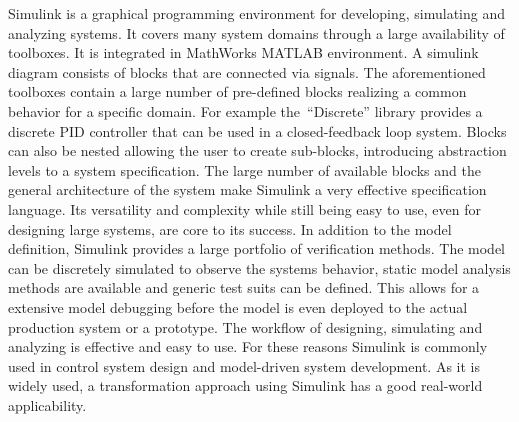 Simulink is a graphical programming environment for developing, simulating and analyzing systems.
It covers many system domains through a large availability of toolboxes.
It is integrated in MathWorks MATLAB environment.
A simulink diagram consists of blocks that are connected via signals.
The aforementioned toolboxes contain a large number of pre-defined blocks realizing a common behavior for a specific domain.
For example the~\enquote{Discrete} library provides a discrete PID controller that can be used in a closed-feedback loop system.
Blocks can also be nested allowing the user to create sub-blocks, introducing abstraction levels to a system specification.
The large number of available blocks and the general architecture of the system make Simulink a very effective specification language.
Its versatility and complexity while still being easy to use, even for designing large systems, are core to its success.
In addition to the model definition, Simulink provides a large portfolio of verification methods.
The model can be discretely simulated to observe the systems behavior, static model analysis methods are available and generic test suits can be defined.
This allows for a extensive model debugging before the model is even deployed to the actual production system or a prototype.
The workflow of designing, simulating and analyzing is effective and easy to  use.
For these reasons Simulink is commonly used in control system design and model-driven system development.
As it is widely used, a transformation approach using Simulink has a good real-world applicability.

